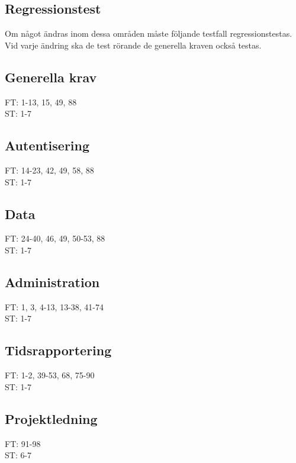 \documentclass[a4paper]{article}
\begin{document}
\begin{appendices}

\section{Regressionstest}

Om något ändras inom dessa områden måste följande testfall regressionstestas. Vid varje ändring ska de test rörande de generella kraven också testas.

\subsection{Generella krav}

FT: 1-13, 15, 49, 88\\
ST: 1-7

\subsection{Autentisering}

FT: 14-23, 42, 49, 58, 88\\
ST: 1-7

\subsection{Data}

FT: 24-40, 46, 49, 50-53, 88\\
ST: 1-7

\subsection{Administration}

FT: 1, 3, 4-13, 13-38, 41-74 \\
ST: 1-7

\subsection{Tidsrapportering}

FT: 1-2, 39-53, 68, 75-90\\
ST: 1-7

\subsection{Projektledning}

FT: 91-98\\
ST: 6-7

\end{appendices}
\end{document}
